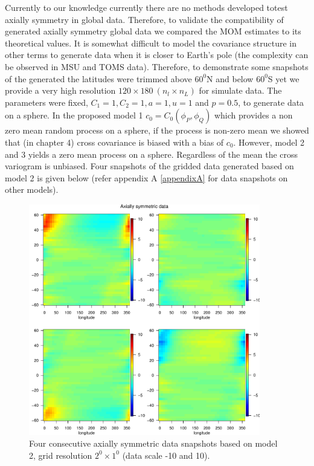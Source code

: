 
%
%

Currently to our knowledge currently there are no methods developed totest axially symmetry in  global data. Therefore, to validate the compatibility of generated axially symmetry global data we compared the MOM estimates to its theoretical values. It is somewhat difficult to model the covariance structure in other terms to generate data when it is closer to Earth's pole (the complexity can be observed in MSU and TOMS data). Therefore, to demonstrate some snapshots of the generated the latitudes were trimmed above $60^0$N and below $60^0$S yet we provide a very high resolution $120\times 180\ (n_l\times n_L)$ for simulate data. The parameters were fixed, $C_1 = 1, C_2 = 1, a = 1, u = 1$ and $p=0.5$, to generate data on a sphere. In the proposed model 1 $c_0 = C_0(\phi_P, \phi_Q)$ which provides a non zero mean random process on a sphere, if the process is non-zero mean we showed that (in chapter 4) cross covariance is biased with a bias of $c_0$. However,  model 2 and 3 yields a zero mean process on a sphere. Regardless of the mean the cross variogram is unbiased. Four snapshots of the gridded data generated based on model 2 is given below (refer appendix A \ref{appendixA} for data snapshots on other models). 

\begin{figure}[H]
	\label{grid_plot_model2}
	\begin{center}
		\includegraphics [width=0.9\textwidth ]{graphs/Data_sample_120_model2.pdf}
		\caption{Four consecutive axially symmetric data snapshots based on model 2, grid resolution $2^0\times 1^0$ (data scale -10 and 10).}
	\end{center}
\end{figure}

